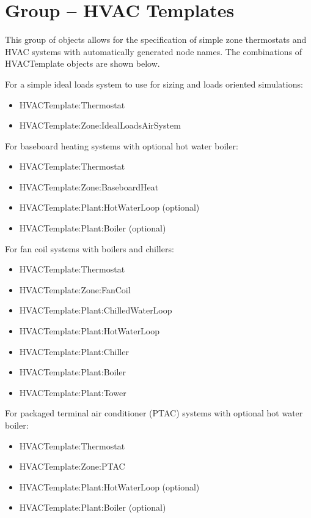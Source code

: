 \section{Group -- HVAC Templates}\label{group-hvac-templates}

This group of objects allows for the specification of simple zone thermostats and HVAC systems with automatically generated node names. The combinations of HVACTemplate objects are shown below.

For a simple ideal loads system to use for sizing and loads oriented simulations:

\begin{itemize}
\item
  HVACTemplate:Thermostat
\item
  HVACTemplate:Zone:IdealLoadsAirSystem
\end{itemize}

For baseboard heating systems with optional hot water boiler:

\begin{itemize}
\item
  HVACTemplate:Thermostat
\item
  HVACTemplate:Zone:BaseboardHeat
\item
  HVACTemplate:Plant:HotWaterLoop (optional)
\item
  HVACTemplate:Plant:Boiler (optional)
\end{itemize}

For fan coil systems with boilers and chillers:

\begin{itemize}
\item
  HVACTemplate:Thermostat
\item
  HVACTemplate:Zone:FanCoil
\item
  HVACTemplate:Plant:ChilledWaterLoop
\item
  HVACTemplate:Plant:HotWaterLoop
\item
  HVACTemplate:Plant:Chiller
\item
  HVACTemplate:Plant:Boiler
\item
  HVACTemplate:Plant:Tower
\end{itemize}

For packaged terminal air conditioner (PTAC) systems with optional hot water boiler:

\begin{itemize}
\item
  HVACTemplate:Thermostat
\item
  HVACTemplate:Zone:PTAC
\item
  HVACTemplate:Plant:HotWaterLoop (optional)
\item
  HVACTemplate:Plant:Boiler (optional)
\end{itemize}

